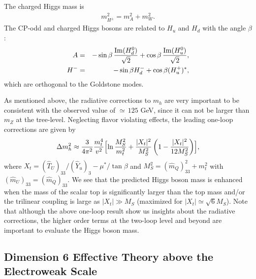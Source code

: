 \documentclass[preprint,3p,12pt]{elsarticle}
\begin{document}
The charged Higgs mass is 
\begin{eqnarray}
m_{H^{\pm}}^2 = m_A^2 + m_W^2.
\end{eqnarray}
The CP-odd and charged Higgs bosons are related to $H_u$ and $H_d$ with the angle $\beta$:
\begin{eqnarray}
A &=& -\sin\beta \, \frac{{\rm Im}(H_d^0)}{\sqrt{2}} + \cos\beta \, \frac{{\rm Im}(H_u^0)}{\sqrt{2}}, \nonumber \\
H^{-} &=& -\sin\beta H_d^- + \cos\beta (H_u^+)^*, 
\end{eqnarray}
which are orthogonal to the Goldstone modes.


\vspace{10pt}
As mentioned above, 
the radiative corrections to $m_h$ are very important to be consistent with the observed value of $\simeq\, 125$ GeV, 
since it can not be larger than $m_Z$ at the tree-level. Neglecting flavor violating effects, the leading one-loop corrections are given by~\cite{Okada:1990vk, Ellis:1990nz, Haber:1990aw}
\begin{eqnarray}
\Delta m_h^2 \approx \frac{3}{4\pi^2} \frac{m_t^4}{v^2} \Bigl[
\ln  \frac{M_S^2}{m_t^2}  
+ \frac{|X_t|^2}{M_S^2} \left(1 - \frac{|X_t|^2}{12 M_S^2} \right)
\Bigr],
\end{eqnarray}
where $X_t = (\hat T_U)_{33}/ (\hat Y_u)_3 - \mu^*/\tan\beta $ and $M_S^2 = (\hat m_{Q})_{33}^2 + m_t^2$ with $(\hat m_{U})_{33} = (\hat m_{Q})_{33}$. 
We see that the predicted Higgs boson mass is enhanced when the mass of the scalar top is significantly larger than the top mass and/or the trilinear coupling is large as $|X_t| \gg M_S$ (maximized for $|X_t| \simeq \sqrt{6} M_S$). 
Note that although the above one-loop result show us insights about the radiative corrections, 
the higher order terms at the two-loop level and beyond are important to evaluate the Higgs boson mass.

\subsection{Dimension 6 Effective Theory above the Electroweak Scale }
\label{sec:Dim6}
\end{document}
